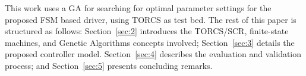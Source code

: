 This work uses a GA for searching for optimal parameter settings for the proposed FSM based driver, using TORCS as test bed. The rest of this paper is structured as follows: Section~\ref{sec:2} introduces the TORCS/SCR, finite-state machines, and Genetic Algorithms concepts involved; Section~\ref{sec:3} details the proposed controller model. Section~\ref{sec:4} describes the evaluation and validation process; and Section~\ref{sec:5} presents concluding remarks.
